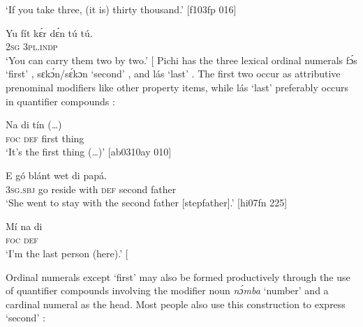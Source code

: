 \glt ‘If you take three, (it is) thirty thousand.’ [f103fp 016]
\z


\ea%
    \label{ex:key:252}
    \gll Yu  fít  kɛ́r    dɛ́n    tú  tú.\\
\textsc{2sg}   \textsc{3pl.indp}  \\
\glt ‘You can carry them two by two.’ [\textstylePichiexamplenumberZchnZchn{bo07fn 231]}
\z
Pichi has the three lexical ordinal numerals fɔ́s ‘first’ , sɛkɔ́n/sɛ́kɔn ‘second’ , and lás ‘last’ . The first two occur as attributive prenominal modifiers like other property items, while lás ‘last’ preferably occurs in quantifier compounds {\fff}: 


\ea%
    \label{ex:key:253}
    \gll Na  di    tín  (…)\\
\textsc{foc}  \textsc{def}  first  thing\\

\glt ‘It’s the first thing (…)’ [ab0310ay 010]
\z


\ea%
    \label{ex:key:254}
    \gll E    gó  blánt  wet    di    papá.\\
\textsc{3sg}.\textsc{sbj}  go  reside  with    \textsc{def}  second  father\\

\glt ‘She went to stay with the second father [stepfather].’ [hi07fn 225]
\z


\ea%
    \label{ex:key:255}
    \gll Mí    na  di  \\
  \textsc{foc}  \textsc{def}  \\

\glt ‘I’m the last person (here).’ [\textstylePichiexamplenumberZchnZchn{nn07fn 234]}
\z

Ordinal numerals except ‘first’ may also be formed productively through the use of quantifier compounds involving the modifier noun \textit{nɔ́mba} ‘number’ and a cardinal numeral as the head. Most people also use this construction to express ‘second’ :


